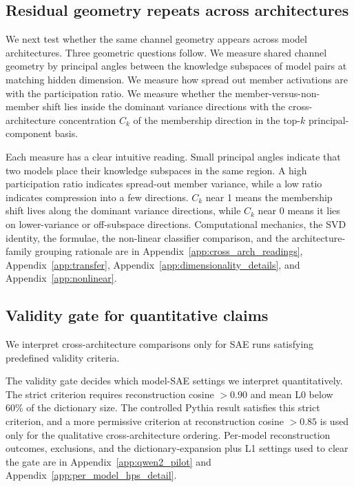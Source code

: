 \subsection{Residual geometry repeats across architectures}
\label{sec:methods:transfer}

We next test whether the same channel geometry appears across model architectures. Three geometric questions follow. We measure shared channel geometry by principal angles between the knowledge subspaces of model pairs at matching hidden dimension. We measure how spread out member activations are with the participation ratio. We measure whether the member-versus-non-member shift lies inside the dominant variance directions with the cross-architecture concentration $C_k$ of the membership direction in the top-$k$ principal-component basis.

Each measure has a clear intuitive reading. Small principal angles indicate that two models place their knowledge subspaces in the same region. A high participation ratio indicates spread-out member variance, while a low ratio indicates compression into a few directions. $C_k$ near 1 means the membership shift lives along the dominant variance directions, while $C_k$ near 0 means it lies on lower-variance or off-subspace directions. Computational mechanics, the SVD identity, the formulae, the non-linear classifier comparison, and the architecture-family grouping rationale are in Appendix~\ref{app:cross_arch_readings}, Appendix~\ref{app:transfer}, Appendix~\ref{app:dimensionality_details}, and Appendix~\ref{app:nonlinear}.

\subsection{Validity gate for quantitative claims}
\label{sec:methods:disclosures}

We interpret cross-architecture comparisons only for SAE runs satisfying predefined validity criteria.

The validity gate decides which model-SAE settings we interpret quantitatively. The strict criterion requires reconstruction cosine $> 0.90$ and mean L0 below 60\% of the dictionary size. The controlled Pythia result satisfies this strict criterion, and a more permissive criterion at reconstruction cosine $> 0.85$ is used only for the qualitative cross-architecture ordering. Per-model reconstruction outcomes, exclusions, and the dictionary-expansion plus L1 settings used to clear the gate are in Appendix~\ref{app:qwen2_pilot} and Appendix~\ref{app:per_model_hps_detail}.

